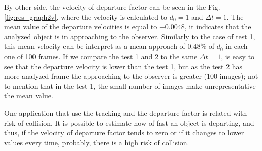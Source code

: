By other side, the velocity of departure factor can be seen in the 
Fig. \ref{fig:res_graph2v}, where the velocity is calculated
to $d_0=1$ and $\Delta t=1$. The mean value of the departure
velocities is equal to $-0.0048$, it indicates that the
analyzed object is in approaching to the observer. Similarly
to the case of test 1, this mean velocity can be interpret
as a mean approach of $0.48\%$ of $d_0$ in each one of 100 frames.
If we compare the test 1 and 2 to the same $\Delta t=1$, is easy to see
that the departure velocity is lower than the test 1, 
but as the test 2 has more analyzed frame the approaching to the observer
is greater (100 images); 
not to mention that in the test 1, the small number of images 
make  unrepresentative the mean value.

One application that use the tracking and the departure factor 
is related with risk of collision.
It is possible to estimate how of fast an object is departing,
and thus, if the velocity of departure factor tends to zero or 
if it changes to lower values every time, 
probably, there is a high risk of collision.


